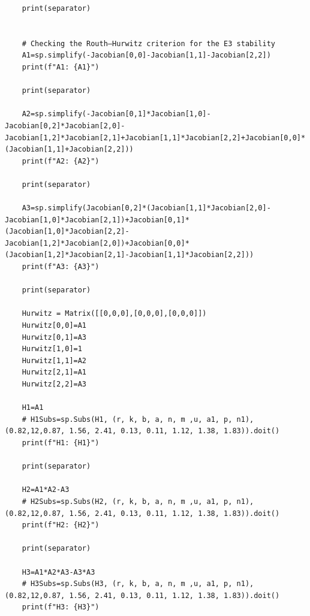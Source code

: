 \documentclass{wscpaperproc}
\theoremstyle{wsc}
\begin{document}
\begin{verbatim}
	print(separator)
	
	
	# Checking the Routh–Hurwitz criterion for the E3 stability
	A1=sp.simplify(-Jacobian[0,0]-Jacobian[1,1]-Jacobian[2,2])
	print(f"A1: {A1}")
	
	print(separator)
	
	A2=sp.simplify(-Jacobian[0,1]*Jacobian[1,0]-Jacobian[0,2]*Jacobian[2,0]-Jacobian[1,2]*Jacobian[2,1]+Jacobian[1,1]*Jacobian[2,2]+Jacobian[0,0]*(Jacobian[1,1]+Jacobian[2,2]))
	print(f"A2: {A2}")
	
	print(separator)
	
	A3=sp.simplify(Jacobian[0,2]*(Jacobian[1,1]*Jacobian[2,0]-Jacobian[1,0]*Jacobian[2,1])+Jacobian[0,1]*(Jacobian[1,0]*Jacobian[2,2]-Jacobian[1,2]*Jacobian[2,0])+Jacobian[0,0]*(Jacobian[1,2]*Jacobian[2,1]-Jacobian[1,1]*Jacobian[2,2]))
	print(f"A3: {A3}")
	
	print(separator)
	
	Hurwitz = Matrix([[0,0,0],[0,0,0],[0,0,0]])
	Hurwitz[0,0]=A1
	Hurwitz[0,1]=A3
	Hurwitz[1,0]=1
	Hurwitz[1,1]=A2
	Hurwitz[2,1]=A1
	Hurwitz[2,2]=A3
	
	H1=A1
	# H1Subs=sp.Subs(H1, (r, k, b, a, n, m ,u, a1, p, n1), (0.82,12,0.87, 1.56, 2.41, 0.13, 0.11, 1.12, 1.38, 1.83)).doit()
	print(f"H1: {H1}")
	
	print(separator)
	
	H2=A1*A2-A3
	# H2Subs=sp.Subs(H2, (r, k, b, a, n, m ,u, a1, p, n1), (0.82,12,0.87, 1.56, 2.41, 0.13, 0.11, 1.12, 1.38, 1.83)).doit()
	print(f"H2: {H2}")
	
	print(separator)
	
	H3=A1*A2*A3-A3*A3
	# H3Subs=sp.Subs(H3, (r, k, b, a, n, m ,u, a1, p, n1), (0.82,12,0.87, 1.56, 2.41, 0.13, 0.11, 1.12, 1.38, 1.83)).doit()
	print(f"H3: {H3}")
\end{verbatim}
\label{Jacobian}
\end{document}
